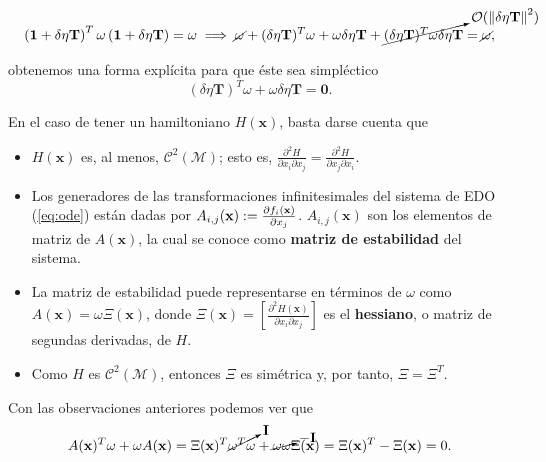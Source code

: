 \begin{align*}
  \left( \mathbf{1} + \delta \eta \mathbf{T} \right)^T \omega \left( \mathbf{1} + \delta \eta \mathbf{T} \right) = \omega \implies 
  \cancel{\omega} + (\delta \eta \mathbf{T})^T \omega + \omega \delta \eta \mathbf{T} + \cancelto{\mathcal{O}(\left\lVert\delta \eta \mathbf{T}\right\rVert^2)} {(\delta \eta \mathbf{T})^T \omega \delta \eta \mathbf{T}} = \cancel{\omega}, 
\end{align*}

obtenemos una forma explícita para que éste sea simpléctico
\begin{equation}
  (\delta \eta \mathbf{T})^T \omega + \omega \delta \eta \mathbf{T} = \mathbf{0}.
  \label{eq:eq:symplectic_condition2}
\end{equation}

En el caso de tener un hamiltoniano $H(\mathbf{x})$, basta darse cuenta que
\begin{itemize}
\item $H(\mathbf{x})$ es, al menos, $\mathcal{C}^2(\mathcal{M})$; esto es, $\frac{\partial^2 H}{\partial x_i \partial x_j} = \frac{\partial^2 H}{\partial x_j \partial x_i}$.

\item Los generadores de las transformaciones infinitesimales del sistema de EDO (\ref{eq:ode}) están dadas por $A_{i,j}(\mathbf{x}) := \frac{\partial f_i(\mathbf{x})}{\partial x_j}$. $A_{i,j}(\mathbf{x})$ son los elementos de matriz de $A(\mathbf{x})$, la cual se conoce como \textbf{matriz de estabilidad} del sistema.

\item La matriz de estabilidad puede representarse en términos de $\omega$ como $A(\mathbf{x}) = \omega \Xi(\mathbf{x})$, donde $\Xi(\mathbf{x}) = \left[ \frac{\partial^2 H(\mathbf{x})}{\partial x_i \partial x_j} \right]$ es el \textbf{hessiano}, o matriz de segundas derivadas, de $H$.

\item Como $H$ es $\mathcal{C}^2(\mathcal{M})$, entonces $\Xi$ es simétrica y, por tanto, $\Xi = \Xi^T$.
\end{itemize}

Con las observaciones anteriores podemos ver que
\begin{align*}
 A(\mathbf{x})^T \omega + \omega A(\mathbf{x}) = \Xi(\mathbf{x})^T \cancelto{\mathbf{I}}{\omega^T \omega} + \cancelto{-\mathbf{I}}{\omega \omega}\Xi(\mathbf{x}) = \Xi(\mathbf{x})^T - \Xi(\mathbf{x}) = 0.
\end{align*}

